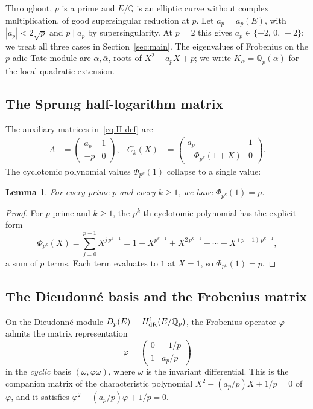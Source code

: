 \documentclass[11pt,a4paper]{amsart}
\newtheorem{lemma}[theorem]{Lemma}
\theoremstyle{definition}
\newcommand{\Q}{\mathbb{Q}}
\newcommand{\Qp}{\mathbb{Q}_p}
\begin{document}
Throughout, $p$ is a prime and $E/\Q$ is an elliptic curve without complex multiplication, of good supersingular reduction at $p$. Let $a_p = a_p(E)$, with $|a_p| < 2\sqrt{p}$ and $p \mid a_p$ by supersingularity. At $p = 2$ this gives $a_p \in \{-2,\, 0,\, +2\}$; we treat all three cases in Section~\ref{sec:main}. The eigenvalues of Frobenius on the $p$-adic Tate module are $\alpha, \bar\alpha$, roots of $X^2 - a_p X + p$; we write $K_\alpha = \Q_p(\alpha)$ for the local quadratic extension.

\subsection{The Sprung half-logarithm matrix}\label{ssec:H-def}

The auxiliary matrices in~\eqref{eq:H-def} are
\begin{align}
A &= \begin{pmatrix} a_p & 1 \\ -p & 0 \end{pmatrix}, &
C_k(X) &= \begin{pmatrix} a_p & 1 \\ -\Phi_{p^k}(1+X) & 0 \end{pmatrix}.
\end{align}
The cyclotomic polynomial values $\Phi_{p^k}(1)$ collapse to a single value:
\begin{lemma}\label{lem:Phi-at-1}
For every prime $p$ and every $k \geq 1$, we have $\Phi_{p^k}(1) = p$.
\end{lemma}
\begin{proof}
For $p$ prime and $k \geq 1$, the $p^k$-th cyclotomic polynomial has the explicit form
\[
\Phi_{p^k}(X) = \sum_{j=0}^{p-1} X^{j\,p^{k-1}} = 1 + X^{p^{k-1}} + X^{2\,p^{k-1}} + \cdots + X^{(p-1)\,p^{k-1}},
\]
a sum of $p$ terms. Each term evaluates to $1$ at $X = 1$, so $\Phi_{p^k}(1) = p$.
\end{proof}

\subsection{The Dieudonn\'e basis and the Frobenius matrix}\label{ssec:dieudonne}

On the Dieudonn\'e module $D_p(E) = H^1_{\rm dR}(E/\Qp)$, the Frobenius operator $\varphi$ admits the matrix representation
\begin{equation}\label{eq:phi-matrix}
\varphi = \begin{pmatrix} 0 & -1/p \\ 1 & a_p/p \end{pmatrix}
\end{equation}
in the \emph{cyclic} basis $(\omega, \varphi\omega)$, where $\omega$ is the invariant differential. This is the companion matrix of the characteristic polynomial $X^2 - (a_p/p)X + 1/p = 0$ of $\varphi$, and it satisfies $\varphi^2 - (a_p/p) \varphi + 1/p = 0$.
\end{document}
